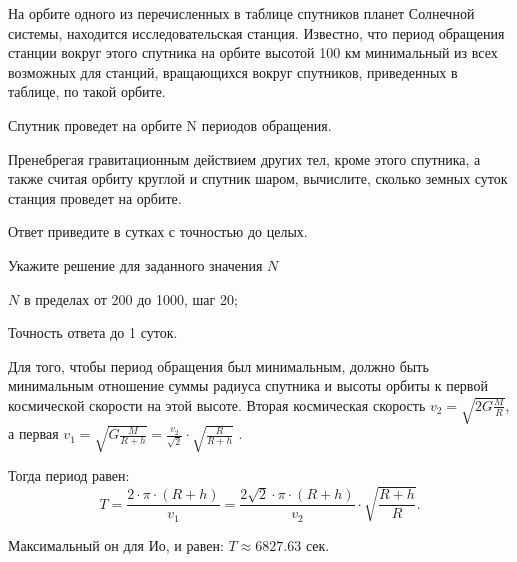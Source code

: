
На орбите одного из перечисленных в таблице спутников планет Солнечной системы, находится исследовательская станция. Известно, что период обращения станции вокруг этого спутника на орбите высотой 100 км минимальный из всех возможных для станций, вращающихся вокруг спутников, приведенных в таблице, по такой орбите.


Спутник проведет на орбите N периодов обращения. 

Пренебрегая гравитационным действием других тел, кроме этого
спутника, а также считая орбиту круглой и спутник шаром, вычислите, сколько
земных суток станция проведет на орбите. 

Ответ приведите в сутках с точностью до целых.

Укажите решение для заданного значения $N$

\paramSection

$N$ в пределах от 200 до 1000, шаг 20;         

Точность ответа  до  1  суток.

\solutionSection

Для того, чтобы период обращения был минимальным, должно быть минимальным отношение суммы радиуса спутника  
и высоты орбиты к первой космической скорости на этой высоте. Вторая космическая скорость $v_2=\sqrt{2G \frac{M}{R}}$, 
а первая \linebreak $v_1=\sqrt{G \frac{M}{R+h}}=\frac{v_2}{\sqrt{2}} \cdot \sqrt{\frac{R}{R+h}}$ .

Тогда период равен:  $$T=\frac{2 \cdot \pi \cdot (R+h)}{  v_1 }=\frac{2\sqrt{2} \cdot \pi \cdot (R+h)}{v_2}  \cdot \sqrt{\frac{R+h}{R}}.$$

Максимальный он для Ио, и равен:  $ T \approx 6827.63$ сек.


